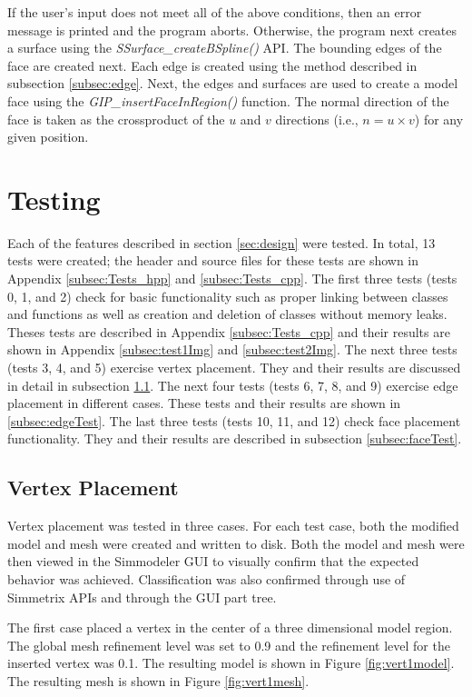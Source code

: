 \documentclass[a4paper, 12pt]{article}
\begin{document}
If the user's input does not meet all of the above conditions, then
an error message is printed and the program aborts. Otherwise, 
the program next creates a surface using the \emph{SSurface\_createBSpline()} 
API. The bounding edges of the face are created next. 
Each edge is created using the method described in 
subsection \ref{subsec:edge}. Next, the edges and surfaces are used to 
create a model face using the \emph{GIP\_insertFaceInRegion()} function. 
The normal direction of the face is taken as the crossproduct of 
the $u$ and $v$ directions (i.e., $n=u\times v$) for any given position. 

\section{Testing} \label{sec:testing}
Each of the features described in section \ref{sec:design} were
tested. In total, 13 tests were created; the header and
source files for these tests are shown in 
Appendix \ref{subsec:Tests_hpp} and \ref{subsec:Tests_cpp}. The first three
tests (tests 0, 1, and 2) check for basic functionality such as proper linking 
between classes and functions as well as creation and deletion of classes 
without memory leaks. Theses tests are described in Appendix \ref{subsec:Tests_cpp}
and their results are shown in Appendix \ref{subsec:test1Img} 
and \ref{subsec:test2Img}. The next three tests (tests 3, 4, and 5) 
exercise vertex placement. They and their results are discussed in detail
in subsection \ref{subsec:vertexTest}. The next four tests (tests 6, 7, 8, and 9)
exercise edge placement in different cases. These tests and their results 
are shown in \ref{subsec:edgeTest}. The last three tests (tests 10, 11, and 12)
check face placement functionality. They and their results are described in 
subsection \ref{subsec:faceTest}.

\subsection{Vertex Placement} \label{subsec:vertexTest}
Vertex placement was tested in three cases. For each test case, both
the modified model and mesh were created and written to disk. Both 
the model and mesh were then viewed in the Simmodeler GUI to visually confirm
that the expected behavior was achieved. Classification was also confirmed
through use of Simmetrix APIs and through the GUI part tree. 

The first case placed a vertex in the center of a three dimensional
model region. The global mesh refinement level was set to 0.9 and the 
refinement level for the inserted vertex was 0.1.
The resulting model is shown in Figure \ref{fig:vert1model}.
The resulting mesh is shown in Figure \ref{fig:vert1mesh}.
\end{document}
